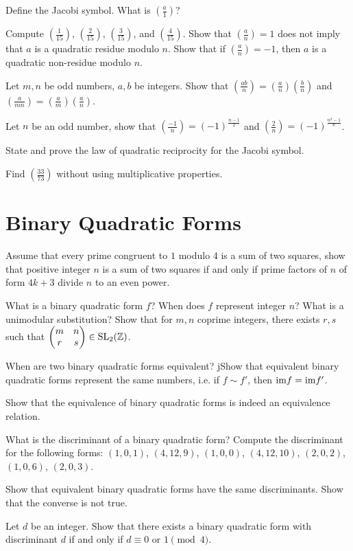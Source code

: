 \begin{question}{13}
    Define the Jacobi symbol. What is $(\frac{a}{1})$?

    Compute $(\frac{1}{15})$, $(\frac{2}{15})$, $(\frac{3}{15})$, and $(\frac{4}{15})$. Show that $(\frac{a}{n}) = 1$ does not imply that $a$ is a quadratic residue modulo $n$. Show that if $(\frac{a}{n}) = -1$, then $a$ is a quadratic non-residue modulo $n$.

    Let $m,n$ be odd numbers, $a,b$ be integers. Show that $(\frac{ab}{n}) = (\frac{a}{n})(\frac{b}{n})$ and $(\frac{a}{mn}) = (\frac{a}{m})(\frac{a}{n})$.

    Let $n$ be an odd number, show that $(\frac{-1}{n}) = (-1)^\frac{n-1}{2}$ and $(\frac{2}{n}) = (-1)^\frac{n^2-1}{8}$.

    State and prove the law of quadratic reciprocity for the Jacobi symbol.

    Find $(\frac{33}{73})$ without using multiplicative properties.
\end{question}


\section{Binary Quadratic Forms}
\begin{question}{13.5}
	Assume that every prime congruent to $1$ modulo $4$ is a sum of two squares, show that positive integer $n$ is a sum of two squares if and only if prime factors of $n$ of form $4k+3$ divide $n$ to an even power.
\end{question}

\begin{question}{14}
    What is a binary quadratic form $f$? When does $f$ represent integer $n$? What is a unimodular substitution? Show that for $m,n$ coprime integers, there exists $r,s$ such that $\begin{pmatrix}
        m & n \\ r & s
    \end{pmatrix} \in \text{SL}_2(\mathbb{Z})$.

    When are two binary quadratic forms equivalent? jShow that equivalent binary quadratic forms represent the same numbers, i.e. if $f \sim f'$, then $\text{im} f = \text{im} f'$. 

    Show that the equivalence of binary quadratic forms is indeed an equivalence relation.
\end{question}

\begin{question}{15}
    What is the discriminant of a binary quadratic form? Compute the discriminant for the following forms: $(1,0,1)$, $(4,12,9)$, $(1,0,0)$, $(4,12,10)$, $(2,0,2)$, $(1,0,6)$, $(2,0,3)$.

    Show that equivalent binary quadratic forms have the same discriminants. Show that the converse is not true.

    Let $d$ be an integer. Show that there exists a binary quadratic form with discriminant $d$ if and only if $d \equiv 0$ or $1 \pmod{4}$. 
\end{question}

